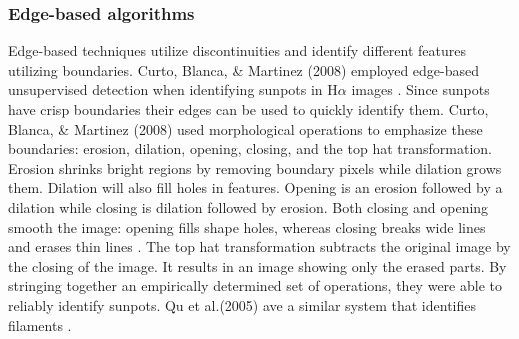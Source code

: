 \documentclass[twoside]{report}
\begin{document}
\subsubsection{Edge-based algorithms}
Edge-based techniques utilize discontinuities and identify different features utilizing boundaries. Curto, Blanca, \& Martinez (2008) employed edge-based unsupervised detection when identifying sunpots in H$\alpha$ images \cite{curto2008automatic}. Since sunpots have crisp boundaries their edges can be used to quickly identify them. Curto, Blanca, \& Martinez (2008) used morphological operations to emphasize these boundaries: erosion, dilation, opening, closing, and the top hat transformation. Erosion shrinks bright regions by removing boundary pixels while dilation grows them. Dilation will also fill holes in features. Opening is an erosion followed by a dilation while closing is dilation followed by erosion. Both closing and opening smooth the image: opening fills shape holes, whereas closing breaks wide lines and erases thin lines \cite{curto2008automatic}. The top hat transformation subtracts the original image by the closing of the image. It results in an image showing only the erased parts. By stringing together an empirically determined set of operations, they were able to reliably identify sunpots. Qu et al.(2005) ave a similar system that identifies filaments \cite{qu2005automatic}. 
\end{document}
